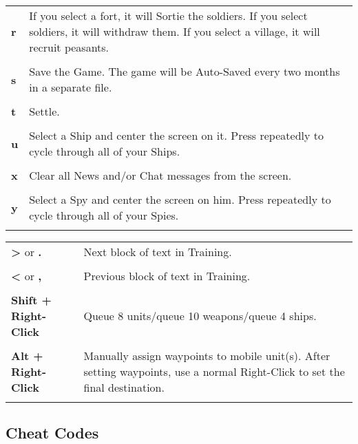 
\begin{tabular}{p{1in} p{3in}}
    \textbf{r} & If you select a fort, it will Sortie the soldiers. If you select soldiers, it will withdraw them. If you select a village, it will recruit peasants.\\ \\    
    \textbf{s} & Save the Game. The game will be Auto-Saved every two months in a separate file.\\ \\        
    \textbf{t} & Settle.\\ \\    
    \textbf{u} & Select a Ship and center the screen on it. Press repeatedly to cycle through all of your Ships.\\ \\        
    \textbf{x} & Clear all News and/or Chat messages from the screen.\\ \\        
    \textbf{y} & Select a Spy and center the screen on him. Press repeatedly to cycle through all of your Spies.\\ \\
\end{tabular}

\begin{tabular}{p{1in} p{3in}}
    \textbf{\textgreater} or \textbf{.} & Next block of text in Training.\\ \\        
    \textbf{\textless} or \textbf{,} & Previous block of text in Training.\\ \\    
    \textbf{Shift + Right-Click} & Queue 8 units/queue 10 weapons/queue 4 ships.\\ \\


    \textbf{Alt + Right-Click} & Manually assign waypoints to mobile unit(s). After setting waypoints, use a normal Right-Click to set the final destination.\\ \\
\end{tabular}

\subsection{\textsf{Cheat Codes}}

